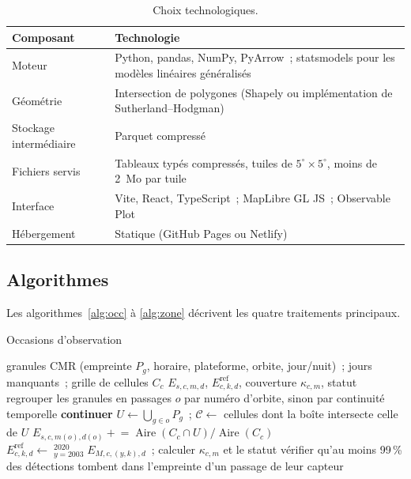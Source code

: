\documentclass[11pt,a4paper]{article}
\DeclareMathOperator{\med}{m\acute{e}d}
\DeclareMathOperator{\Aire}{Aire}
\begin{document}
\begin{table}[h]
\centering\small
\caption{Choix technologiques.}
\begin{tabularx}{\linewidth}{l Y}
\toprule
Composant & Technologie \\
\midrule
Moteur & Python, pandas, NumPy, PyArrow~; statsmodels pour les modèles linéaires généralisés \\
Géométrie & Intersection de polygones (Shapely ou implémentation de Sutherland--Hodgman) \\
Stockage intermédiaire & Parquet compressé \\
Fichiers servis & Tableaux typés compressés, tuiles de $5^\circ \times 5^\circ$, moins de 2~Mo par tuile \\
Interface & Vite, React, TypeScript~; MapLibre GL JS~; Observable Plot \\
Hébergement & Statique (GitHub Pages ou Netlify) \\
\bottomrule
\end{tabularx}
\end{table}

\subsection{Algorithmes}

Les algorithmes~\ref{alg:occ} à \ref{alg:zone} décrivent les quatre traitements principaux.

\begin{algorithm}[h]
\caption{Occasions d'observation}
\label{alg:occ}
\begin{algorithmic}[1]
\Require granules CMR (empreinte $P_g$, horaire, plateforme, orbite, jour/nuit)~; jours manquants~; grille de cellules $C_c$
\Ensure $E_{s,c,m,d}$, $E^{\text{ref}}_{c,k,d}$, couverture $\kappa_{c,m}$, statut
  \State regrouper les granules en passages $o$ par numéro d'orbite, sinon par continuité temporelle
     \State \textbf{continuer} \EndIf
    \State $U \gets \bigcup_{g\in o} P_g$~; \; $\mathcal{C} \gets$ cellules dont la boîte intersecte celle de $U$
      \State $E_{s,c,m(o),d(o)} \mathrel{+}= \Aire(C_c \cap U)/\Aire(C_c)$ 
    \EndFor
  \EndFor
\EndFor
\State $E^{\text{ref}}_{c,k,d} \gets \med_{y=2003}^{2020} E_{M,c,(y,k),d}$~; calculer $\kappa_{c,m}$ et le statut
\State vérifier qu'au moins 99\,\% des détections tombent dans l'empreinte d'un passage de leur capteur
\end{algorithmic}
\end{algorithm}
\end{document}
